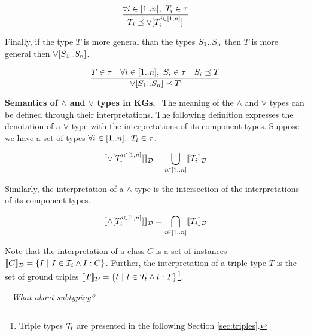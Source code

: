 \documentclass[runningheads]{llncs}
\newcommand{\I}{{\cal I}}
\newcommand{\T}{{\cal T}}
\newcommand{\memo}[1]{}
\newcommand{\notes}[1]{\noindent\begin{small}-- \emph{#1}\hfill\break\end{small}}
\begin{document}
\memo{\begin{equation}
\dfrac{T_1,T_2\in\tau}
      {T_1\preceq\/T_1\lor\/T_2}
\end{equation}

\begin{equation}
\dfrac{T_1,T_2\in\tau}
      {T_2\preceq\/T_1\lor\/T_2}
\end{equation}}

\begin{equation}
\label{rul:lor-1}
\dfrac{\forall\/i\in[1..n],\ T_i\in\tau}
      {T_i\preceq\/\lor[T_i^{i\in[1,n]}]}
\end{equation}

Finally, if the type $T$ is more general than the types $S_1..\/S_n$
then $T$ is more general then $\lor[S_1..\/S_n]$.

\memo{\begin{equation}
\dfrac{T,S_1,S_2\in\tau\quad S_1\preceq\/T\quad\/S_2\preceq\/\/T}
      {S_1\lor\/S_2\preceq\/T}  
\end{equation}}

\begin{equation}
\label{rul:lor-2}
\dfrac{T\in\tau\quad\forall\/i\in[1..n],\ S_i\in\tau\quad\/S_i\preceq\/T}
      {\lor[S_1..\/S_n]\preceq\/T}  
\end{equation}


\medskip\noindent
\textbf{Semantics of $\land$ and $\lor$ types in KGs.$\ \ $}
The meaning of the $\land$ and $\lor$ types can be defined through
their interpretations. The following definition expresses the
denotation of a $\lor$ type with the interpretations of its component
types. Suppose we have a set of types
$\forall\/i\in\/[1..n],\ T_i\in\tau$.

\begin{displaymath}
  \llbracket\lor[T_i^{i\in[1,n]}]\rrbracket_{\cal D} = \bigcup_{i\in[1..n]}\llbracket\/T_i\rrbracket_{\cal D}
\end{displaymath}

Similarly, the interpretation of a $\land$ type is the intersection of
the interpretations of its component types.

\begin{displaymath}
\llbracket\land[T_i^{i\in[1,n]}]\rrbracket_{\cal D} = \bigcap_{i\in[1..n]}\llbracket\/T_i\rrbracket_{\cal D}
\end{displaymath}

Note that the interpretation of a class $C$ is a set of instances
$\llbracket\/C\rrbracket_\D=\{I\ |\ I\in\I_i\land\/I:C\}$. Further, the
interpretation of a triple type $T$ is the set of ground triples
$\llbracket\/T\rrbracket_\D=\{t\ |\ t\in\T_t\land\/t:T\}$\footnote{Triple
  types $\T_t$ are presented in the following Section
  \ref{sec:triples}.}\cite{Savnik2025}.\\
\notes{What about subtyping?}
\end{document}
